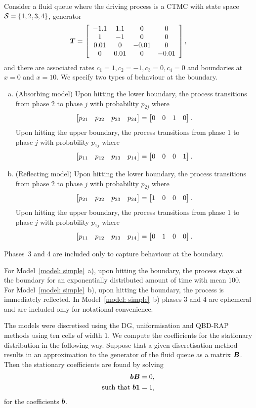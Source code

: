 \begin{model}\label{model: simple}
	Consider a fluid queue where the driving process is a CTMC with state space \(\mathcal{S}=\{1,2,3,4\}\), generator 
	\[\boldsymbol T = \left[\begin{array}{cccc}
		-1.1 & 1.1 & 0 & 0 \\
		1 & -1 & 0 & 0 \\ 
		0.01 & 0 & -0.01 & 0 \\
		0 & 0.01 & 0 & -0.01 
	\end{array}\right],\]
	and there are associated rates \(c_1=1, c_2 = -1, c_3=0, c_4=0\) and boundaries at \(x=0\) and \(x=10\). We specify two types of behaviour at the boundary.
	\begin{enumerate}[a)]
		\item (Absorbing model) Upon hitting the lower boundary, the process transitions from phase \(2\) to phase \(j\) with probability \(p_{2j}\) where 
		\[\begin{bmatrix} p_{21} & p_{22} & p_{23} & p_{24} \end{bmatrix} = \begin{bmatrix} 0 & 0 & 1 & 0 \end{bmatrix}.\]
		Upon hitting the upper boundary, the process transitions from phase \(1\) to phase \(j\) with probability \(p_{1j}\) where 
		\[\begin{bmatrix} p_{11} & p_{12} & p_{13} & p_{14} \end{bmatrix} = \begin{bmatrix} 0 & 0 & 0 & 1 \end{bmatrix}.\]
		\item (Reflecting model) Upon hitting the lower boundary, the process transitions from phase \(2\) to phase \(j\) with probability \(p_{2j}\) where 
		\[\begin{bmatrix} p_{21} & p_{22} & p_{23} & p_{24} \end{bmatrix} = \begin{bmatrix} 1 & 0 & 0 & 0 \end{bmatrix}.\]
		Upon hitting the upper boundary, the process transitions from phase \(1\) to phase \(j\) with probability \(p_{1j}\) where 
		\[\begin{bmatrix} p_{11} & p_{12} & p_{13} & p_{14} \end{bmatrix} = \begin{bmatrix} 0 & 1 & 0 & 0 \end{bmatrix}.\]
	\end{enumerate}
\end{model}
Phases~3 and 4 are included only to capture behaviour at the boundary.

For Model~\ref{model: simple}~a), upon hitting the boundary, the process stays at the boundary for an exponentially distributed amount of time with mean 100. For Model~\ref{model: simple}~b), upon hitting the boundary, the process is immediately reflected. In Model~\ref{model: simple}~b) phases 3 and 4 are ephemeral and are included only for notational convenience. 

The models were discretised using the DG, uniformisation and QBD-RAP methods using ten cells of width \(1\). We compute the coefficients for the stationary distribution in the following way. Suppose that a given discretisation method results in an approximation to the generator of the fluid queue as a matrix \(\boldsymbol B\). Then the stationary coefficients are found by solving 
\begin{align}
	\boldsymbol b \boldsymbol B = 0,\\
	\mbox{such that } \boldsymbol b\boldsymbol 1=1,
\end{align}
for the coefficients \(\boldsymbol b\). 

